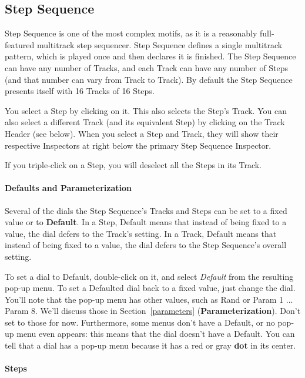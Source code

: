 \documentclass[twoside,10pt]{article}
\begin{document}
\subsection{Step Sequence}

Step Sequence is one of the most complex motifs, as it is a reasonably full-featured multitrack step sequencer.  Step Sequence defines a single multitrack pattern, which is played once and then declares it is finished.  The Step Sequence can have any number of Tracks, and each Track can have any number of Steps (and that number can vary from Track to Track).  By default the Step Sequence presents itself with 16 Tracks of 16 Steps.  

You select a Step by clicking on it.  This also selects the Step's Track.  You can also select a different Track (and its equivalent Step) by clicking on the Track Header (see below).  When you select a Step and Track, they will show their respective Inspectors at right below the primary Step Sequence Inspector.

If you triple-click on a Step, you will deselect all the Steps in its Track.

\paragraph{Defaults and Parameterization}

Several of the dials the Step Sequence's Tracks and Steps can be set to a fixed value or to {\bf Default}.  In a Step, Default means that instead of being fixed to a value, the dial defers to the Track's setting.  In a Track, Default means that instead of being fixed to a value, the dial defers to the Step Sequence's overall setting.

To set a dial to Default, double-click on it, and select {\it Default} from the resulting pop-up menu.  To set a Defaulted dial back to a fixed value, just change the dial.  You'll note that the pop-up menu has other values, such as Rand or Param 1 ... Param 8.  We'll discuss those in Section~\ref{parameters} ({\bf Parameterization}).  Don't set to those for now.  Furthermore, some menus don't have a Default, or no pop-up menu even appears: this means that the dial doesn't have a Default.  You can tell that a dial has a pop-up menu because it has a red or gray {\bf dot} in its center. 

\paragraph{Steps}
\end{document}
